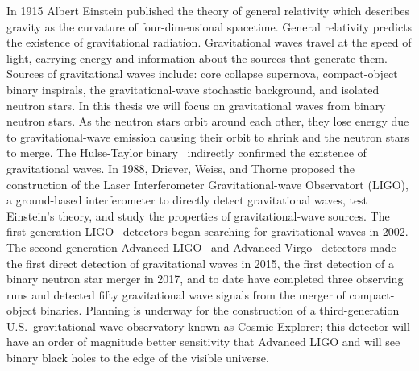 In 1915 Albert Einstein published the theory of general relativity which describes gravity as the curvature of four-dimensional spacetime. General relativity predicts the existence of gravitational radiation. Gravitational waves travel at the speed of light, carrying energy and information about the sources that generate them. Sources of gravitational waves include: core collapse supernova, compact-object binary inspirals, the gravitational-wave stochastic background, and isolated neutron stars. In this thesis we will focus on gravitational waves from binary neutron stars. As the neutron stars orbit around each other, they lose energy due to gravitational-wave emission causing their orbit to shrink and the neutron stars to merge. The Hulse-Taylor binary~\cite{Hulse:1974eb} indirectly confirmed the existence of gravitational waves. In 1988, Driever, Weiss, and Thorne proposed the construction of the Laser Interferometer Gravitational-wave Observatort (LIGO), a ground-based interferometer to directly detect gravitational waves, test Einstein's theory, and study the properties of gravitational-wave sources. The first-generation LIGO~\cite{Barish:1999} detectors began searching for gravitational waves in 2002. The second-generation Advanced LIGO~\cite{TheLIGOScientific:2014jea} and Advanced Virgo~\cite{TheVirgo:2014hva} detectors made the first direct detection of gravitational waves in 2015, the first detection of a binary neutron star merger in 2017, and to date have completed three observing runs and detected fifty gravitational wave signals from the merger of compact-object binaries. Planning is underway for the construction of a third-generation U.S.~gravitational-wave observatory known as Cosmic Explorer; this detector will have an order of magnitude better sensitivity that Advanced LIGO and will see binary black holes to the edge of the visible universe.


